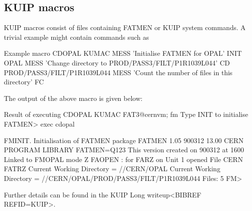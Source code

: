 \subsection{KUIP macros}
\par
KUIP macros consist of files containing FATMEN or KUIP system commands.
A trivial example might contain commands such as
\begin{XMPt}{Example macro CDOPAL KUMAC}
MESS 'Initialise FATMEN for OPAL'
INIT OPAL
MESS 'Change directory to PROD/PASS3/FILT/P1R1039L044'
CD PROD/PASS3/FILT/P1R1039L044
MESS 'Count the number of files in this directory'
FC
\end{XMPt}

\par
The output of the above macro is given below:
\begin{XMPt}{Result of executing CDOPAL KUMAC}
FAT3@cernvm;
fm
Type INIT to initialise FATMEN>
exec cdopal
 
FMINIT.  Initialisation of FATMEN package
FATMEN   1.05  900312 13.00  CERN PROGRAM LIBRARY FATMEN=Q123
         This version created on      900312  at        1600
Linked to FMOPAL               mode Z
FAOPEN : for FARZ on Unit    1 opened File CERN FATRZ
Current Working Directory = //CERN/OPAL
Current Working Directory = //CERN/OPAL/PROD/PASS3/FILT/P1R1039L044
Files:    5
FM>
\end{XMPt}

Further details can be found in the KUIP Long writeup<BIBREF REFID=KUIP>.
